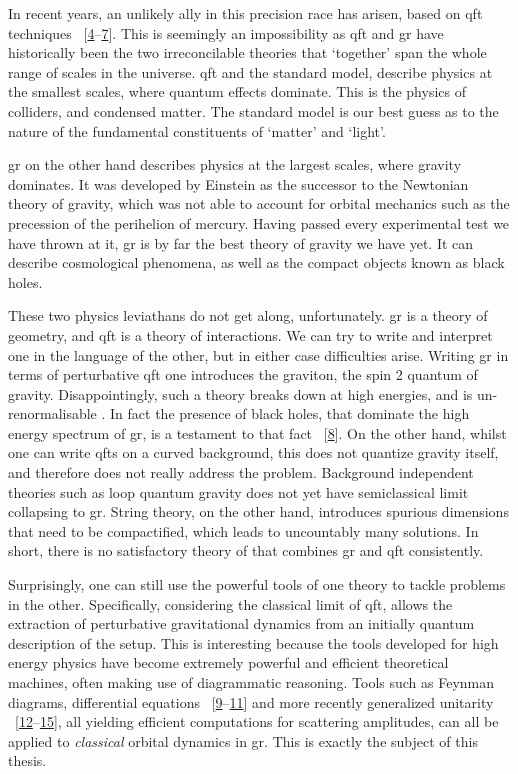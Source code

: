\documentclass[
  11pt,
  a4paper,
  DIV=11,
  numbers=noendperiod,
  twoside]{scrreprt}
\DeclareRobustCommand{\[}{\begin{equation}}
\DeclareRobustCommand{\]}{\end{equation}}
\begin{document}
In recent years, an unlikely ally in this precision race has arisen,
based on \gls{qft} techniques
~{[}\protect\hyperlink{ref-Goldberger:2004jt}{4}--\protect\hyperlink{ref-Neill:2013wsa}{7}{]}.
This is seemingly an impossibility as \gls{qft} and \gls{gr} have
historically been the two irreconcilable theories that `together' span
the whole range of scales in the universe. \gls{qft} and the standard
model, describe physics at the smallest scales, where quantum effects
dominate. This is the physics of colliders, and condensed matter. The
standard model is our best guess as to the nature of the fundamental
constituents of `matter' and `light'.

\gls{gr} on the other hand describes physics at the largest scales,
where gravity dominates. It was developed by Einstein as the successor
to the Newtonian theory of gravity, which was not able to account for
orbital mechanics such as the precession of the perihelion of mercury.
Having passed every experimental test we have thrown at it, \gls{gr} is
by far the best theory of gravity we have yet. It can describe
cosmological phenomena, as well as the compact objects known as black
holes.

These two physics leviathans do not get along, unfortunately. \gls{gr}
is a theory of geometry, and \gls{qft} is a theory of interactions. We
can try to write and interpret one in the language of the other, but in
either case difficulties arise. Writing \gls{gr} in terms of
perturbative \gls{qft} one introduces the graviton, the spin 2 quantum
of gravity. Disappointingly, such a theory breaks down at high energies,
and is un-renormalisable . In fact the presence of black holes, that
dominate the high energy spectrum of \gls{gr}, is a testament to that
fact ~{[}\protect\hyperlink{ref-Shomer:2007vq}{8}{]}. On the other hand,
whilst one can write \glspl{qft} on a curved background, this does not
quantize gravity itself, and therefore does not really address the
problem. Background independent theories such as loop quantum gravity
does not yet have semiclassical limit collapsing to \gls{gr}. String
theory, on the other hand, introduces spurious dimensions that need to
be compactified, which leads to uncountably many solutions. In short,
there is no satisfactory theory of that combines \gls{gr} and \gls{qft}
consistently.

Surprisingly, one can still use the powerful tools of one theory to
tackle problems in the other. Specifically, considering the classical
limit of \gls{qft}, allows the extraction of perturbative gravitational
dynamics from an initially quantum description of the setup. This is
interesting because the tools developed for high energy physics have
become extremely powerful and efficient theoretical machines, often
making use of diagrammatic reasoning. Tools such as Feynman diagrams,
differential equations
~{[}\protect\hyperlink{ref-Remiddi:1997ny}{9}--\protect\hyperlink{ref-Kotikov:1990kg}{11}{]}
and more recently generalized unitarity
~{[}\protect\hyperlink{ref-Bern:1994cg}{12}--\protect\hyperlink{ref-Anastasiou:2006jv}{15}{]},
all yielding efficient computations for scattering amplitudes, can all
be applied to \emph{classical} orbital dynamics in \gls{gr}. This is
exactly the subject of this thesis.
\end{document}
